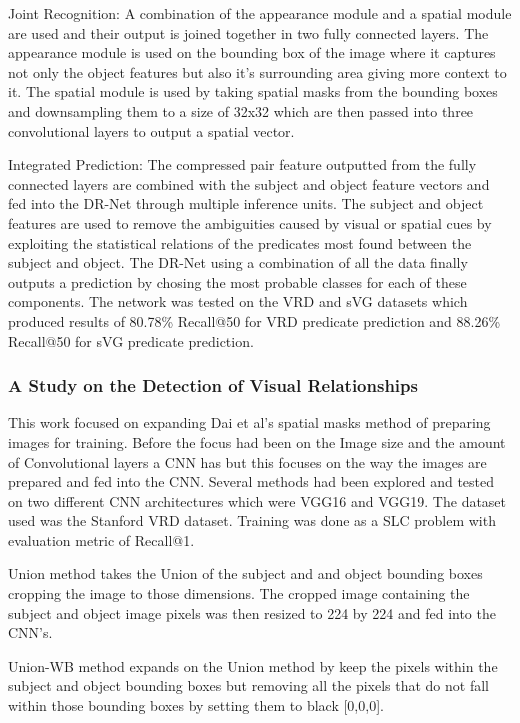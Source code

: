 \documentclass{csfyp}
\begin{document}
Joint Recognition:
A combination of the appearance module and a spatial module are used and their output is joined together in two fully connected layers. The appearance module is used on the bounding box of the image where it captures not only the object features but also it’s surrounding area giving more context to it. The spatial module is used by taking spatial masks from the bounding boxes and downsampling them to a size of 32x32 which are then passed into three convolutional layers to output a spatial vector. 

Integrated Prediction:
The compressed pair feature outputted from the fully connected layers are combined with the subject and object feature vectors and fed into the DR-Net through multiple inference units. The subject and object features are used to remove the ambiguities caused by visual or spatial cues by exploiting the statistical relations of the predicates most found between the subject and object. The DR-Net using a combination of all the data finally outputs a prediction by chosing the most probable classes for each of these components. 
The network was tested on the VRD and sVG datasets which produced results of 80.78\% Recall@50 for VRD predicate prediction and 88.26\% Recall@50 for sVG predicate prediction.


\subsubsection{A Study on the Detection of Visual Relationships}
This work focused on expanding Dai et al’s spatial masks method of preparing images for training. Before the focus had been on the Image size and the amount of Convolutional layers a CNN has but this focuses on the way the images are prepared and fed into the CNN. Several methods had been explored and tested on two different CNN architectures which were VGG16 and VGG19. The dataset used was the Stanford VRD dataset.  Training was done as a SLC problem with evaluation metric of Recall@1.

Union method takes the Union of the subject and and object bounding boxes cropping the image to those dimensions. The cropped image containing the subject and object image pixels was then resized to 224 by 224 and fed into the CNN’s.

Union-WB method expands on the Union method by keep the pixels within the subject and object bounding boxes but removing all the pixels that do not fall within those bounding boxes by setting them to black [0,0,0]. 
\end{document}
